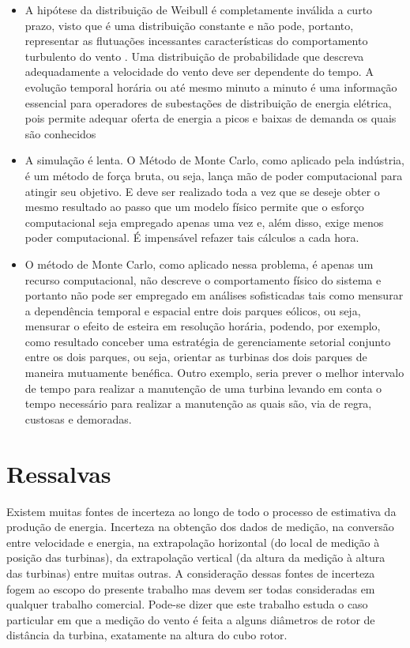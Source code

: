 \documentclass[
	12pt,				%
	openright,			%
	oneside,			%
	a4paper,			%
	english,			%
	french,				%
	spanish,			%
	brazil				%
	]{abntex2}
\begin{document}
\begin{itemize}
    \item A hipótese da distribuição de Weibull é completamente inválida a curto prazo, visto que é uma distribuição constante e não pode, portanto, representar as flutuações incessantes características do comportamento turbulento do vento \cite{artmain}. Uma distribuição de probabilidade que descreva adequadamente a velocidade do vento deve ser dependente do tempo. A evolução temporal horária ou até mesmo minuto a minuto é uma informação essencial para operadores de subestações de distribuição de energia elétrica, pois permite adequar oferta de energia a picos e baixas de demanda os quais são conhecidos    
    \item A simulação é lenta. O Método de Monte Carlo, como aplicado pela indústria, é um método de força bruta, ou seja, lança mão de poder computacional para atingir seu objetivo. E deve ser realizado toda a vez que se deseje obter o mesmo resultado ao passo que um modelo físico permite que o esforço computacional seja empregado apenas uma vez e, além disso, exige menos poder computacional. É impensável refazer tais cálculos a cada hora.
    \item O método de Monte Carlo, como aplicado nessa problema, é apenas um recurso computacional, não descreve o comportamento físico do sistema e portanto não pode ser empregado em análises sofisticadas tais como mensurar a dependência temporal e espacial entre dois parques eólicos, ou seja, mensurar o efeito de esteira \cite{atlas} em resolução horária, podendo, por exemplo, como resultado conceber uma estratégia de gerenciamente setorial conjunto entre os dois parques, ou seja, orientar as turbinas dos dois parques de maneira mutuamente benéfica. Outro exemplo, seria prever o melhor intervalo de tempo para realizar a manutenção de uma turbina levando em conta o tempo necessário para realizar a manutenção as quais são, via de regra, custosas e demoradas.
\end{itemize}

\section{Ressalvas}

Existem muitas fontes de incerteza ao longo de todo o processo de estimativa da produção de energia. Incerteza na obtenção dos dados de medição, na conversão entre velocidade e energia, na extrapolação horizontal (do local de medição à posição das turbinas), da extrapolação vertical (da altura da medição à altura das turbinas) entre muitas outras. A consideração dessas fontes de incerteza fogem ao escopo do presente trabalho mas devem ser todas consideradas em qualquer trabalho comercial. Pode-se dizer que este trabalho estuda o caso particular em que a medição do vento é feita a alguns diâmetros de rotor de distância da turbina, exatamente na altura do cubo rotor.
\end{document}
